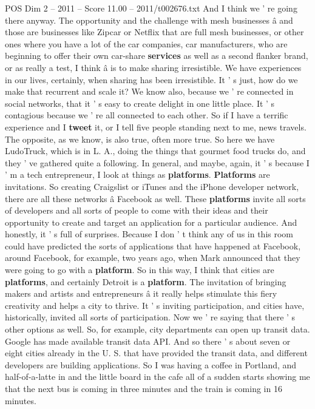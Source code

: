 \begin{textsample}{POS Dim 2 – 2011 – Score 11.00 – 2011/t002676.txt}
And I think we ' re going there anyway.
The opportunity and the challenge with mesh businesses â and those are businesses like Zipcar or Netflix that are full mesh businesses, or other ones where you have a lot of the car companies, car manufacturers, who are beginning to offer their own car-share \textbf{services} as well as a second flanker brand, or as really a test, I think â is to make sharing irresistible.
We have experiences in our lives, certainly, when sharing has been irresistible.
It ' s just, how do we make that recurrent and scale it?
We know also, because we ' re connected in social networks, that it ' s easy to create delight in one little place.
It ' s contagious because we ' re all connected to each other.
So if I have a terrific experience and I \textbf{tweet} it, or I tell five people standing next to me, news travels.
The opposite, as we know, is also true, often more true.
So here we have LudoTruck, which is in L.
A., doing the things that gourmet food trucks do, and they ' ve gathered quite a following.
In general, and maybe, again, it ' s because I ' m a tech entrepreneur, I look at things as \textbf{platforms}. \textbf{Platforms} are invitations.
So creating Craigslist or iTunes and the iPhone developer network, there are all these networks â Facebook as well.
These \textbf{platforms} invite all sorts of developers and all sorts of people to come with their ideas and their opportunity to create and target an application for a particular audience.
And honestly, it ' s full of surprises.
Because I don ' t think any of us in this room could have predicted the sorts of applications that have happened at Facebook, around Facebook, for example, two years ago, when Mark announced that they were going to go with a \textbf{platform}.
So in this way, I think that cities are \textbf{platforms}, and certainly Detroit is a \textbf{platform}.
The invitation of bringing makers and artists and entrepreneurs â it really helps stimulate this fiery creativity and helps a city to thrive.
It ' s inviting participation, and cities have, historically, invited all sorts of participation.
Now we ' re saying that there ' s other options as well.
So, for example, city departments can open up transit data.
Google has made available transit data API.
And so there ' s about seven or eight cities already in the U.
S. that have provided the transit data, and different developers are building applications.
So I was having a coffee in Portland, and half-of-a-latte in and the little board in the cafe all of a sudden starts showing me that the next bus is coming in three minutes and the train is coming in 16 minutes.

\end{textsample}
